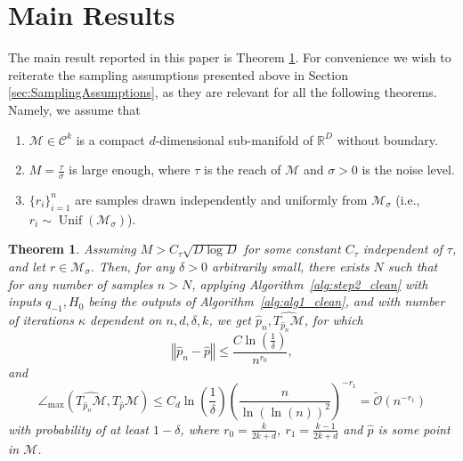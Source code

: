 \documentclass[12pt]{article}
\newtheorem{Theorem}{Theorem}[section]
\theoremstyle{remark}
\newcommand{\RR}{\mathbb{R}}
\newcommand{\MM}{\mathcal{M}}
\newcommand{\C}{\mathcal{C}}
\newcommand{\norm}[1]{\left\Vert #1 \right\Vert}
\newcommand{\wtilde}[1]{\widetilde{#1}}
\begin{document}


\section{Main Results}\label{sec:mainResults}
The main result reported in this paper is Theorem \ref{thm:MainResult}.
For convenience we wish to reiterate the sampling assumptions presented above in Section \ref{sec:SamplingAssumptions}, as they are relevant for all the following theorems.
Namely, we assume that 
\begin{enumerate}
    \item[i] $\MM\in\C^k$ is a compact $d$-dimensional sub-manifold of $\RR^D$ without boundary.
    \item[ii] $M = \frac{\tau}{\sigma}$ is large enough, where $\tau$ is the reach of $\MM$ and $\sigma>0$ is the noise level. 
    \item[iii] $\{r_i\}_{i=1}^n$ are samples drawn independently and uniformly from $\MM_\sigma$ (i.e., $r_i\sim \operatorname{Unif}(\MM_\sigma)$).
\end{enumerate}



\begin{Theorem}\label{thm:MainResult}
    Assuming $M > C_\tau \sqrt{D\log D}$ for some constant $C_\tau$ independent of $\tau$, and let $r\in \MM_\sigma$.
    Then, for any $\delta>0$ arbitrarily small, there exists $ N $ such that for any number of samples $ n > N $,
    applying Algorithm~\ref{alg:step2_clean} with inputs $q_{-1}, H_0$ being the outputs of Algorithm~\ref{alg:alg1_clean}, and with number of iterations $\kappa$ dependent on $n,d, \delta, k$, we get $ \hat p_n, \widehat{T_{\hat p_n}\MM} $, for which 
	\[
	\norm{\hat p_n - \hat p} \leq \frac{C\ln\left(\frac{1}{\delta}\right)}{n^{r_0}}
	,\]
	and 
	\[
	\angle_{\max}(\widehat{T_{\hat p_n}\MM},T_{\hat p}\MM) \leq  C_{d}\ln\left(\frac{1}{\delta}\right) \left(\frac{ n}{\ln\left(\ln(n) \right)^2}\right)^{-r_1} = \wtilde{\mathcal{O}}(n^{-r_1}) 
	\]
	with probability of at least $ 1 - \delta $, where $ r_0 = \frac{k}{2k +d} $, $ r_1 = \frac{k-1}{2k +d} $ and $\hat p$ is some point in $\MM$.
\end{Theorem}
\end{document}
